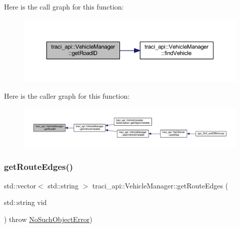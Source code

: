 Here is the call graph for this function\+:\nopagebreak
\begin{figure}[H]
\begin{center}
\leavevmode
\includegraphics[width=350pt]{classtraci__api_1_1_vehicle_manager_a3cbdffab3f5fd337a6de08a14b87803e_cgraph}
\end{center}
\end{figure}
Here is the caller graph for this function\+:\nopagebreak
\begin{figure}[H]
\begin{center}
\leavevmode
\includegraphics[width=350pt]{classtraci__api_1_1_vehicle_manager_a3cbdffab3f5fd337a6de08a14b87803e_icgraph}
\end{center}
\end{figure}
\mbox{\label{classtraci__api_1_1_vehicle_manager_a399053f44944093adf9a00536bf86bba}} 
\subsubsection{\texorpdfstring{get\+Route\+Edges()}{getRouteEdges()}}
{\footnotesize\ttfamily std\+::vector$<$ std\+::string $>$ traci\+\_\+api\+::\+Vehicle\+Manager\+::get\+Route\+Edges (\begin{DoxyParamCaption}\item[{std\+::string}]{vid }\end{DoxyParamCaption}) throw  \hyperlink{classtraci__api_1_1_no_such_object_error}{No\+Such\+Object\+Error}) }

